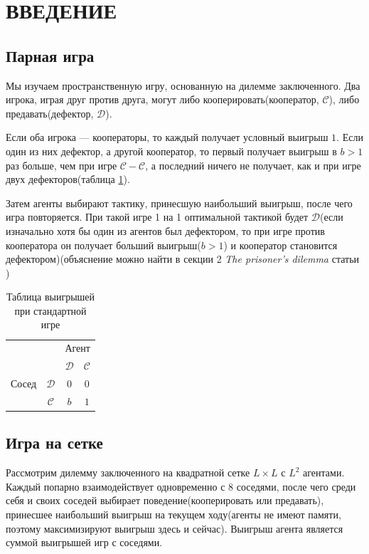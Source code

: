 \documentclass[12pt]{article}
\begin{document}
    \tableofcontents
    \newpage

\section*{ВВЕДЕНИЕ}
    \label{sec:intro}
\subsection*{Парная игра}
    Мы изучаем пространственную игру, основанную на дилемме заключенного. Два игрока, играя друг против друга, могут либо кооперировать(кооператор, $\mathcal{C}$), либо предавать(дефектор, $\mathcal{D}$).
        
    Если оба игрока — кооператоры, то каждый получает условный выигрыш $1$. Если один из них дефектор, а другой кооператор, то первый получает выигрыш в $b>1$ раз больше, чем при игре $\mathcal{C}-\mathcal{C}$, а последний ничего не получает, как и при игре двух дефекторов(таблица \ref{table:gametable}). 
    
    Затем агенты выбирают тактику, принесшую наибольший выигрыш, после чего игра повторяется.
    При такой игре 1 на 1 оптимальной тактикой будет $\mathcal{D}$(если изначально хотя бы один из агентов был дефектором, то при игре против кооператора он получает больший выигрыш($b>1$) и кооператор становится дефектором)(объяснение можно найти в секции 2 \textit{The prisoner’s dilemma} статьи \cite{NACHBAR1992307})

    \begin{table}[h!]\centering
        \begin{tabular}{cc|c|c|}
              & \multicolumn{1}{c}{} & \multicolumn{2}{c}{Агент}\\
              & \multicolumn{1}{c}{} & \multicolumn{1}{c}{$\mathcal{D}$}  & \multicolumn{1}{c}{$\mathcal{C}$} \\\cline{3-4}
              {Сосед}  & $\mathcal{D}$ & $0$ & $0$ \\\cline{3-4}
              & $\mathcal{C}$ & $b$ & $1$ \\\cline{3-4}
        \end{tabular}
        \caption{Таблица выигрышей при стандартной игре}
        \label{table:gametable}
    \end{table}

\subsection*{Игра на сетке}
    Рассмотрим дилемму заключенного на квадратной сетке $L\times L$ с $L^2$ агентами. Каждый попарно взаимодействует одновременно с 8 соседями, после чего среди себя и своих соседей выбирает поведение(кооперировать или предавать), принесшее наибольший выигрыш на текущем ходу(агенты не имеют памяти, поэтому максимизируют выигрыш здесь и сейчас). Выигрыш агента является суммой выигрышей игр с соседями.
\end{document}
